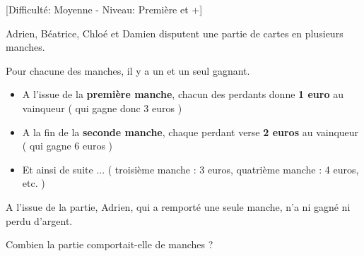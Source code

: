 
%
[Difficulté: Moyenne - Niveau: Première et +]


\begin{center}
\end{center}Adrien, Béatrice, Chloé et Damien disputent une partie de cartes en plusieurs manches.
\par
Pour chacune des manches, il y a un et un seul gagnant.
\begin{itemize}
     \item
     A l'issue de la \textbf{première manche}, chacun des perdants donne \textbf{1 euro} au vainqueur ( qui gagne donc 3 euros )
     \item
     A la fin de la \textbf{seconde manche}, chaque perdant verse \textbf{2 euros} au vainqueur ( qui gagne 6 euros )
     \item
     Et ainsi de suite ... ( troisième manche : 3 euros, quatrième manche : 4 euros, etc. )
\end{itemize}
A l'issue de la partie, Adrien, qui a remporté une seule manche, n'a ni gagné ni perdu d'argent.
\par
Combien la partie comportait-elle de manches ?

